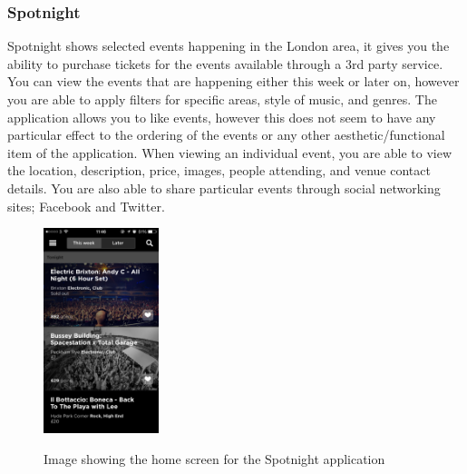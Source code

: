 		\subsubsection{Spotnight}
			Spotnight\cite{spotnight} shows selected events happening in the London area, it gives you the ability to purchase tickets for the events available through a 3rd party service. You can view the events that are happening either this week or later on, however you are able to apply filters for specific areas, style of music, and genres. The application allows you to like events, however this does not seem to have any particular effect to the ordering of the events or any other aesthetic/functional item of the application. When viewing an individual event, you are able to view the location, description, price, images, people attending, and venue contact details. You are also able to share particular events through social networking sites; Facebook and Twitter. 

			\begin{figure}[ht] %
				\caption[Spotnight home screen]{Image showing the home screen for the Spotnight application }
				\centering
				\includegraphics[width=0.3\textwidth]{Images/spotnight}
				\label{fig:spotnight}
			\end{figure}
		
